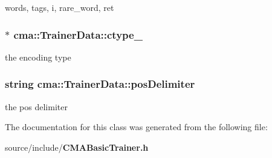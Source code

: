 words, tags, i, rare\_\-word, ret 
\subsubsection{$\ast$ {\bf cma::TrainerData::ctype\_\-}}\label{classcma_1_1TrainerData_a415bd191302d39887f15f1511392ab3}


the encoding type 
\subsubsection{\setlength{\rightskip}{0pt plus 5cm}string {\bf cma::TrainerData::posDelimiter}}\label{classcma_1_1TrainerData_24b6c6f09b1ffe2c5228730901147224}


the pos delimiter 

The documentation for this class was generated from the following file:\begin{CompactItemize}
\item 
source/include/{\bf CMABasicTrainer.h}\end{CompactItemize}
